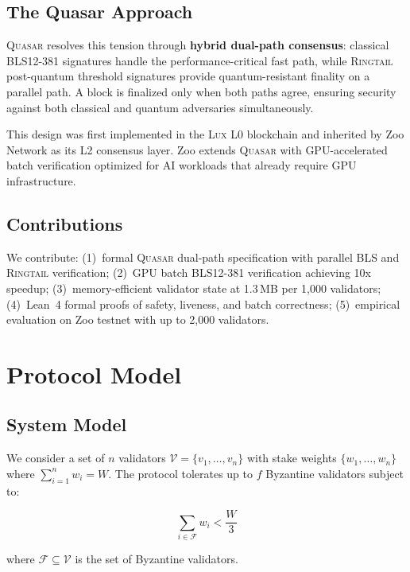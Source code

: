 \documentclass[11pt,letterpaper]{article}
\theoremstyle{definition}
\theoremstyle{remark}
\newcommand{\Lux}{\textsc{Lux}}
\newcommand{\Quasar}{\textsc{Quasar}}
\newcommand{\Ringtail}{\textsc{Ringtail}}
\begin{document}
\subsection{The Quasar Approach}

\Quasar{} resolves this tension through \textbf{hybrid dual-path consensus}: classical BLS12-381 signatures handle the performance-critical fast path, while \Ringtail{} post-quantum threshold signatures provide quantum-resistant finality on a parallel path. A block is finalized only when both paths agree, ensuring security against both classical and quantum adversaries simultaneously.

This design was first implemented in the \Lux{} L0 blockchain \cite{lux-quasar-consensus} and inherited by Zoo Network as its L2 consensus layer. Zoo extends \Quasar{} with GPU-accelerated batch verification optimized for AI workloads that already require GPU infrastructure.

\subsection{Contributions}

We contribute: (1)~formal \Quasar{} dual-path specification with parallel BLS and \Ringtail{} verification; (2)~GPU batch BLS12-381 verification achieving 10x speedup; (3)~memory-efficient validator state at 1.3\,MB per 1,000 validators; (4)~Lean~4 formal proofs of safety, liveness, and batch correctness; (5)~empirical evaluation on Zoo testnet with up to 2,000 validators.

\section{Protocol Model}

\subsection{System Model}

We consider a set of $n$ validators $\mathcal{V} = \{v_1, \ldots, v_n\}$ with stake weights $\{w_1, \ldots, w_n\}$ where $\sum_{i=1}^{n} w_i = W$. The protocol tolerates up to $f$ Byzantine validators subject to:

\begin{equation}
\sum_{i \in \mathcal{F}} w_i < \frac{W}{3}
\end{equation}

where $\mathcal{F} \subseteq \mathcal{V}$ is the set of Byzantine validators.
\end{document}
